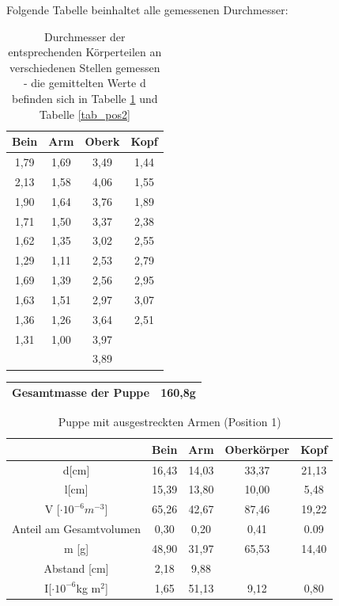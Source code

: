 Folgende Tabelle beinhaltet alle gemessenen Durchmesser:
\begin{table}[H]
\begin{tabular}{|c|c|c|c|}
\hline 
Bein&	Arm	&Oberk	&Kopf	\\ \hline
1,79&	1,69&	3,49&	1,44\\ \hline
2,13&	1,58&	4,06&	1,55\\ \hline
1,90&	1,64&	3,76&	1,89\\ \hline
1,71&	1,50&	3,37&	2,38\\ \hline
1,62&	1,35&	3,02&	2,55\\ \hline
1,29&	1,11&	2,53&	2,79\\ \hline
1,69&	1,39&	2,56&	2,95\\ \hline
1,63&	1,51&	2,97&	3,07\\ \hline
1,36&	1,26&	3,64&	2,51\\ \hline
1,31&	1,00&	3,97&		\\ \hline
	&	&		3,89		&		\\ \hline
\end{tabular}
\caption{Durchmesser der entsprechenden Körperteilen an verschiedenen Stellen gemessen - die gemittelten Werte d befinden sich in Tabelle \ref{tab_pos1} und Tabelle \ref{tab_pos2}}
\end{table}
\begin{table}[H]
\begin{tabular}{|c|c|}
\hline
Gesamtmasse der Puppe & 160,8g \\ \hline
\end{tabular} 
\end{table}

\begin{table}[H]
\begin{tabular}{|c|c|c|c|c|}
\hline 		
&	Bein&	Arm	&Oberkörper	&Kopf	\\ \hline	
d[cm]&	16,43	&14,03&	33,37&	21,13		\\ \hline		
l[cm]&	15,39&	13,80&	10,00	&5,48\\ \hline
V [$\cdot 10^{-6}m^{-3}$]& 65,26&	42,67	&87,46&	19,22\\ \hline		
Anteil am Gesamtvolumen&	0,30	&0,20&	0,41&	0.09\\ \hline
m [g]&	48,90&	31,97	&65,53&	14,40\\ \hline
Abstand [cm] & 2,18	& 9,88	&&\\ \hline	
I[$\cdot 10^{-6}$kg m$^2$]&1,65&	51,13&	9,12&	0,80\\ \hline
\end{tabular} 
\caption{Puppe mit ausgestreckten Armen (Position 1)}
\label{tab_pos1}
\end{table}

